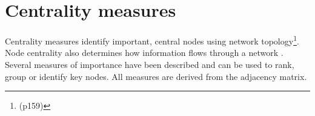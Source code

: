 \section{Centrality measures}
\label{sec:centrality measures}
Centrality measures identify important, central nodes  using  network topology\cite{newman2018networks}\footnote{(p159)}. Node centrality also determines how information flows through a network \cite{borgatti2005centrality}. Several measures of importance have been described and can be used to rank, group or identify key nodes. All measures are derived from the adjacency matrix. 





